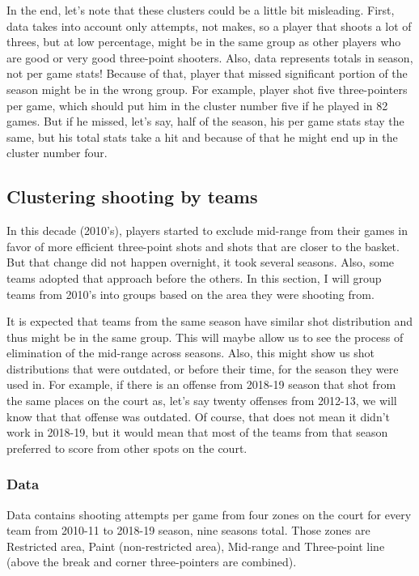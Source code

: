 \documentclass[a4paper]{article}
\begin{document}
In the end, let's note that these clusters could be a little bit misleading. First, data takes into account only attempts, not makes, so a player that shoots a lot of threes, but at low percentage, might be in the same group as other players who are good or very good three-point shooters. Also, data represents totals in season, not per game stats! Because of that, player that missed significant portion of the season might be in the wrong group. For example, player shot five three-pointers per game, which should put him in the cluster number five if he played in 82 games. But if he missed, let's say, half of the season, his per game stats stay the same, but his total stats take a hit and because of that he might end up in the cluster number four.

\subsection{Clustering shooting by teams}
\label{subsec:clust_shooting_by_teams}

In this decade (2010's), players started to exclude mid-range from their games in favor of more efficient three-point shots and shots that are closer to the basket. But that change did not happen overnight, it took several seasons. Also, some teams adopted that approach before the others. In this section, I will group teams from 2010's into groups based on the area they were shooting from.

It is expected that teams from the same season have similar shot distribution and thus might be in the same group. This will maybe allow us to see the process of elimination of the mid-range across seasons. Also, this might show us shot distributions that were outdated, or before their time, for the season they were used in. For example, if there is an offense from 2018-19 season that shot from the same places on the court as, let's say twenty offenses from 2012-13, we will know that that offense was outdated. Of course, that does not mean it didn't work in 2018-19, but it would mean that most of the teams from that season preferred to score from other spots on the court.

\subsubsection{Data}
\label{subsubsec:clust_shooting_by_teams_data}

Data contains shooting attempts per game from four zones on the court for every team from 2010-11 to 2018-19 season, nine seasons total. Those zones are Restricted area, Paint (non-restricted area), Mid-range and Three-point line (above the break and corner three-pointers are combined).
\end{document}
